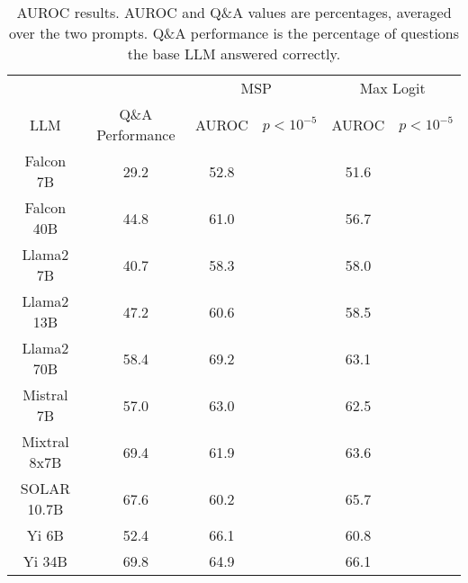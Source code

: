 \begin{table*}
\centering
\begin{tabular}{c|c|c|c|c|c}
& & \multicolumn{2}{c|}{MSP} & \multicolumn{2}{c}{Max Logit} \\ 
LLM & Q\&A Performance & AUROC & $p < 10^{-5}$ & AUROC & $p < 10^{-5}$\\ \hline
Falcon 7B & 29.2 & 52.8 &  & 51.6 & \\
Falcon 40B & 44.8 & 61.0 &  & 56.7 & \\
Llama2 7B & 40.7 & 58.3 &  & 58.0 & \\
Llama2 13B & 47.2 & 60.6 &  & 58.5 & \\
Llama2 70B & 58.4 & 69.2 &  & 63.1 & \\
Mistral 7B & 57.0 & 63.0 &  & 62.5 & \\
Mixtral 8x7B & 69.4 & 61.9 &  & 63.6 & \\
SOLAR 10.7B & 67.6 & 60.2 &  & 65.7 & \\
Yi 6B & 52.4 & 66.1 &  & 60.8 & \\
Yi 34B & 69.8 & 64.9 &  & 66.1 & \\
\hline
\end{tabular}
\caption{AUROC results. AUROC and Q\&A values are percentages, averaged over the two prompts. Q\&A performance is the percentage of questions the base LLM answered correctly.}
\label{tab:auroc}
\end{table*}
